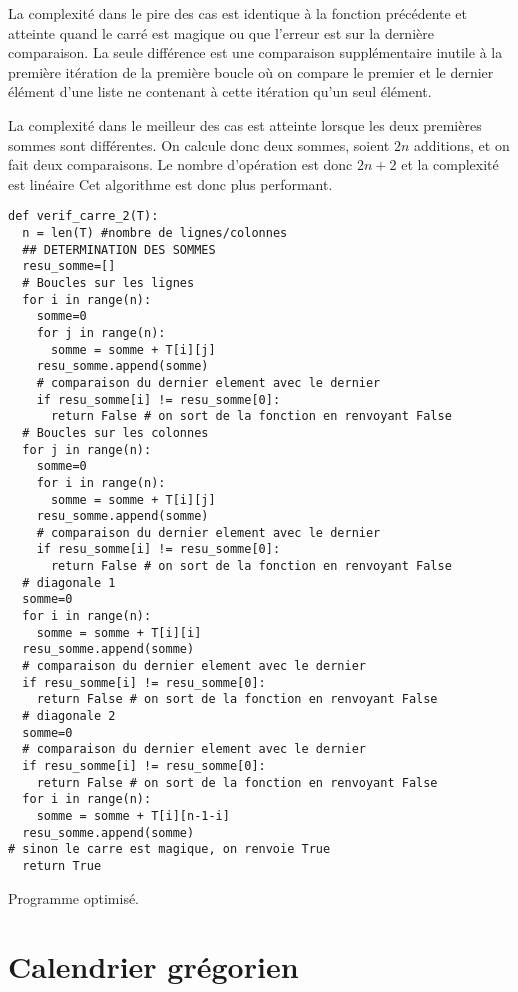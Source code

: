 \begin{enumerate}
La complexité dans le pire des cas est identique à la fonction précédente et atteinte quand le carré est magique ou que l'erreur est sur la dernière comparaison. La seule différence est une comparaison supplémentaire inutile à la première itération de la première boucle où on compare le premier et le dernier élément d'une liste ne contenant à cette itération qu'un seul élément.

La complexité dans le meilleur des cas est atteinte lorsque les deux premières sommes sont différentes. On calcule donc deux sommes, soient $2n$ additions, et on fait deux comparaisons. Le nombre d'opération est donc $2n+2$ et la complexité est linéaire Cet algorithme est donc plus performant.

\begin{listing}[htp]
\begin{verbatim}
def verif_carre_2(T):
  n = len(T) #nombre de lignes/colonnes
  ## DETERMINATION DES SOMMES
  resu_somme=[]
  # Boucles sur les lignes
  for i in range(n):
    somme=0
    for j in range(n):
      somme = somme + T[i][j]
    resu_somme.append(somme)
    # comparaison du dernier element avec le dernier
    if resu_somme[i] != resu_somme[0]:
      return False # on sort de la fonction en renvoyant False
  # Boucles sur les colonnes
  for j in range(n):
    somme=0
    for i in range(n):
      somme = somme + T[i][j]
    resu_somme.append(somme)
    # comparaison du dernier element avec le dernier
    if resu_somme[i] != resu_somme[0]:
      return False # on sort de la fonction en renvoyant False
  # diagonale 1
  somme=0
  for i in range(n):
    somme = somme + T[i][i]
  resu_somme.append(somme)
  # comparaison du dernier element avec le dernier
  if resu_somme[i] != resu_somme[0]:
    return False # on sort de la fonction en renvoyant False
  # diagonale 2
  somme=0
  # comparaison du dernier element avec le dernier
  if resu_somme[i] != resu_somme[0]:
    return False # on sort de la fonction en renvoyant False
  for i in range(n):
    somme = somme + T[i][n-1-i]
  resu_somme.append(somme)
# sinon le carre est magique, on renvoie True
  return True
\end{verbatim}
\caption{Programme optimisé.}
\label{prog:factorielle}
\end{listing}

\end{enumerate}

\newpage
\section{Calendrier grégorien}

